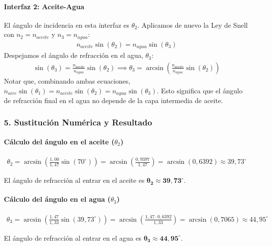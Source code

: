 \paragraph*{Interfaz 2: Aceite-Agua}
El ángulo de incidencia en esta interfaz es $\theta_2$. Aplicamos de nuevo la Ley de Snell con $n_2=n_{aceite}$ y $n_3=n_{agua}$:
\begin{gather}
    n_{aceite} \sin(\theta_2) = n_{agua} \sin(\theta_3)
\end{gather}
Despejamos el ángulo de refracción en el agua, $\theta_3$:
\begin{gather}
    \sin(\theta_3) = \frac{n_{aceite}}{n_{agua}} \sin(\theta_2) \implies \theta_3 = \arcsin\left(\frac{n_{aceite}}{n_{agua}} \sin(\theta_2)\right)
\end{gather}
Notar que, combinando ambas ecuaciones, $n_{aire} \sin(\theta_1) = n_{aceite} \sin(\theta_2) = n_{agua} \sin(\theta_3)$. Esto significa que el ángulo de refracción final en el agua no depende de la capa intermedia de aceite.

\subsubsection*{5. Sustitución Numérica y Resultado}
\paragraph*{Cálculo del ángulo en el aceite ($\theta_2$)}
\begin{gather}
    \theta_2 = \arcsin\left(\frac{1,00}{1,47} \sin(70^{\circ})\right) = \arcsin\left(\frac{0,9397}{1,47}\right) = \arcsin(0,6392) \approx 39,73^{\circ}
\end{gather}
\begin{cajaresultado}
    El ángulo de refracción al entrar en el aceite es $\boldsymbol{\theta_2 \approx 39,73^{\circ}}$.
\end{cajaresultado}
\paragraph*{Cálculo del ángulo en el agua ($\theta_3$)}
\begin{gather}
    \theta_3 = \arcsin\left(\frac{1,47}{1,33} \sin(39,73^{\circ})\right) = \arcsin\left(\frac{1,47 \cdot 0,6392}{1,33}\right) = \arcsin(0,7065) \approx 44,95^{\circ}
\end{gather}
\begin{cajaresultado}
    El ángulo de refracción al entrar en el agua es $\boldsymbol{\theta_3 \approx 44,95^{\circ}}$.
\end{cajaresultado}

